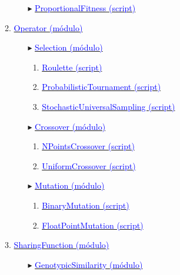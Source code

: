 \documentclass[12pt,twoside]{article}
\begin{document}
\begin{itemize}
\begin{enumerate}[$\square$]
\begin{itemize}
            \item[$\blacktriangleright$] \hyperref[sec:a_2_3_3]{\textcolor{blue}{ProportionalFitness (script)}}
            \end{itemize}
      \item \hyperref[sec:a_2_4]{\textcolor{blue}{Operator (módulo)}}
            \begin{itemize}
            \item[$\blacktriangleright$] \hyperref[sec:a_2_4_1]{\textcolor{blue}{Selection (módulo)}}
                  \begin{enumerate}[$\triangleright$]
                  \item \hyperref[sec:a_2_4_1_1]{\textcolor{blue}{Roulette (script)}}
                  \item \hyperref[sec:a_2_4_1_2]{\textcolor{blue}{ProbabilisticTournament (script)}}
                  \item \hyperref[sec:a_2_4_1_3]{\textcolor{blue}{StochasticUniversalSampling (script)}}
                  \end{enumerate}
            \item[$\blacktriangleright$] \hyperref[sec:a_2_4_2]{\textcolor{blue}{Crossover (módulo)}}
                  \begin{enumerate}[$\triangleright$]
                  \item \hyperref[sec:a_2_4_2_1]{\textcolor{blue}{NPointsCrossover (script)}}
                  \item \hyperref[sec:a_2_4_2_2]{\textcolor{blue}{UniformCrossover (script)}}
                  \end{enumerate}
            \item[$\blacktriangleright$] \hyperref[sec:a_2_4_3]{\textcolor{blue}{Mutation (módulo)}}
                  \begin{enumerate}[$\triangleright$]
                  \item \hyperref[sec:a_2_4_3_1]{\textcolor{blue}{BinaryMutation (script)}}
                  \item \hyperref[sec:a_2_4_3_2]{\textcolor{blue}{FloatPointMutation (script)}}
                  \end{enumerate}
            \end{itemize}
      \item \hyperref[sec:a_2_5]{\textcolor{blue}{SharingFunction (módulo)}}
            \begin{itemize}
            \item[$\blacktriangleright$] \hyperref[sec:a_2_5_1]{\textcolor{blue}{GenotypicSimilarity (módulo)}}

\end{itemize}
\end{enumerate}
\end{itemize}
\end{document}
